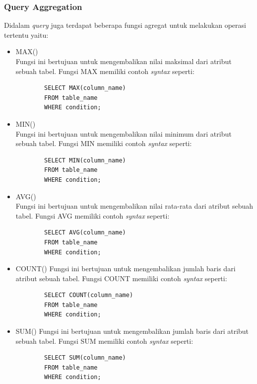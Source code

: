 \subsubsection{Query Aggregation}
Didalam \textit{query} juga terdapat beberapa fungsi agregat untuk melakukan operasi tertentu yaitu:
\begin{itemize}
    \item MAX()\\
    Fungsi ini bertujuan untuk mengembalikan nilai maksimal dari atribut sebuah tabel. Fungsi MAX memiliki contoh \textit{syntax} seperti:
    \begin{verbatim}
        SELECT MAX(column_name)
        FROM table_name
        WHERE condition;
    \end{verbatim}
    
    \item MIN()\\
    Fungsi ini bertujuan untuk mengembalikan nilai minimum dari atribut sebuah tabel. Fungsi MIN memiliki contoh \textit{syntax} seperti:
    \begin{verbatim}
        SELECT MIN(column_name)
        FROM table_name
        WHERE condition;
    \end{verbatim}
    
    \item AVG()\\
    Fungsi ini bertujuan untuk mengembalikan nilai rata-rata dari atribut sebuah tabel. Fungsi AVG memiliki contoh \textit{syntax} seperti:
    \begin{verbatim}
        SELECT AVG(column_name)
        FROM table_name
        WHERE condition;
    \end{verbatim}  
    
    \item COUNT()
     Fungsi ini bertujuan untuk mengembalikan jumlah baris dari atribut sebuah tabel. Fungsi COUNT memiliki contoh \textit{syntax} seperti:
    \begin{verbatim}
        SELECT COUNT(column_name)
        FROM table_name
        WHERE condition;
    \end{verbatim} 
    
    \item SUM()
     Fungsi ini bertujuan untuk mengembalikan jumlah baris dari atribut sebuah tabel. Fungsi SUM memiliki contoh \textit{syntax} seperti:
    \begin{verbatim}
        SELECT SUM(column_name)
        FROM table_name
        WHERE condition;
    \end{verbatim} 
\end{itemize}


